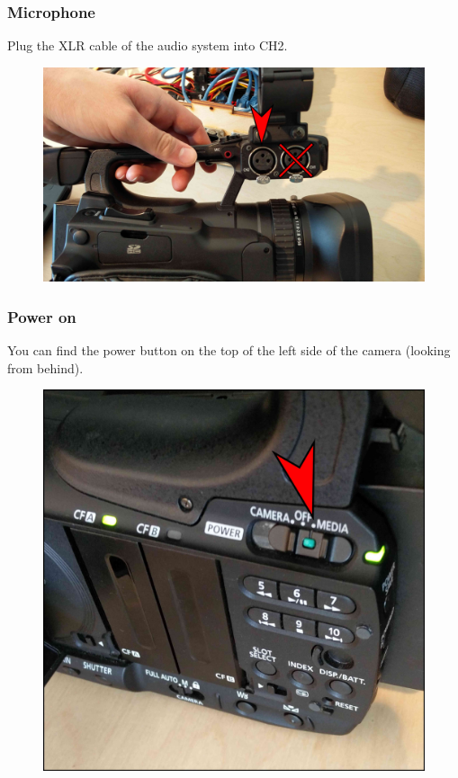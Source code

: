 \documentclass{article}
\begin{document}
\subsubsection{Microphone}
Plug the XLR cable of the audio system into CH2.

\begin{figure}[H]
  \centering
\includegraphics[width = 120mm]{Canon02.jpg}
\end{figure}

\subsubsection{Power on}
You can find the power button on the top of the left side of the camera (looking from behind).

\begin{figure}[H]
  \centering
\includegraphics[width = 120mm]{Canon03.jpg}
\end{figure}
\end{document}
